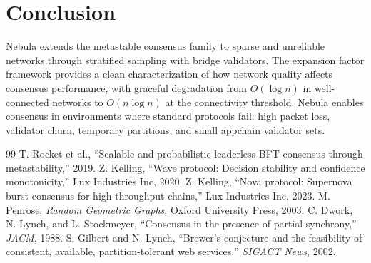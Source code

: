 \section{Conclusion}

\label{sec:conclusion}

Nebula extends the metastable consensus family to sparse and unreliable networks
through stratified sampling with bridge validators. The expansion factor framework
provides a clean characterization of how network quality affects consensus performance,
with graceful degradation from $O(\log n)$ in well-connected networks to $O(n \log n)$
at the connectivity threshold. Nebula enables consensus in environments where standard
protocols fail: high packet loss, validator churn, temporary partitions, and small
appchain validator sets.

\begin{thebibliography}{99}
 T. Rocket et al., ``Scalable and probabilistic leaderless BFT consensus through metastability,'' 2019.
 Z. Kelling, ``Wave protocol: Decision stability and confidence monotonicity,'' Lux Industries Inc, 2020.
 Z. Kelling, ``Nova protocol: Supernova burst consensus for high-throughput chains,'' Lux Industries Inc, 2023.
 M. Penrose, \emph{Random Geometric Graphs}, Oxford University Press, 2003.
 C. Dwork, N. Lynch, and L. Stockmeyer, ``Consensus in the presence of partial synchrony,'' \emph{JACM}, 1988.
 S. Gilbert and N. Lynch, ``Brewer's conjecture and the feasibility of consistent, available, partition-tolerant web services,'' \emph{SIGACT News}, 2002.
\end{thebibliography}

